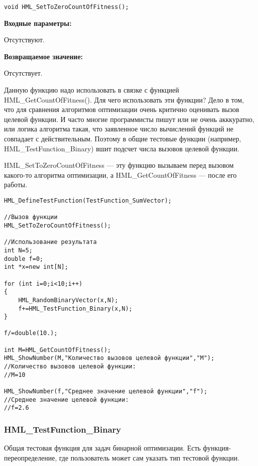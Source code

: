 \documentclass[a4paper,12pt]{article}
\begin{document}
\begin{lstlisting}[label=code_syntax_HML_SetToZeroCountOfFitness,caption=Синтаксис]
void HML_SetToZeroCountOfFitness();
\end{lstlisting}

\textbf{Входные параметры:}

Отсутствуют.

\textbf{Возвращаемое значение:}
 
Отсутствует.

Данную функцию надо использовать в связке с функцией HML\_GetCountOfFitness(). Для чего использовать эти функции? Дело в том, что для сравнения алгоритмов оптимизации очень критично оценивать вызов целевой функции. И часто многие программисты пишут или не очень акккуратно, или логика алгоритма такая, что заявленное число вычислений функций не совпадает с действительным. Поэтому в общие тестовые функции (например, HML\_TestFunction\_Binary) вшит подсчет числа вызовов целевой функции.

HML\_SetToZeroCountOfFitness --- эту функцию вызываем перед вызовом какого-то алгоритма оптимизации, а HML\_GetCountOfFitness --- после его работы.


\begin{lstlisting}[label=code_use_HML_SetToZeroCountOfFitness,caption=Пример использования]
HML_DefineTestFunction(TestFunction_SumVector);

//Вызов функции
HML_SetToZeroCountOfFitness();

//Использование результата
int N=5;
double f=0;
int *x=new int[N];

for (int i=0;i<10;i++)
{
    HML_RandomBinaryVector(x,N);
    f+=HML_TestFunction_Binary(x,N);
}

f/=double(10.);

int M=HML_GetCountOfFitness();
HML_ShowNumber(M,"Количество вызовов целевой функции","M");
//Количество вызовов целевой функции:
//M=10

HML_ShowNumber(f,"Среднее значение целевой функции","f");
//Среднее значение целевой функции:
//f=2.6
\end{lstlisting}

\subsubsection{HML\_TestFunction\_Binary}\label{HML_TestFunction_Binary}

Общая тестовая функция для задач бинарной оптимизации. Есть функция-переопределение, где пользователь может сам указать тип тестовой функции.
\end{document}
